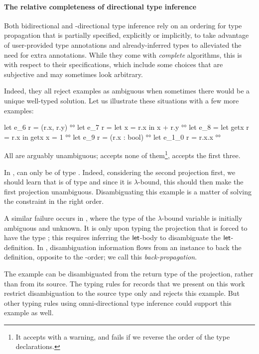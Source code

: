 \documentclass[acmsmall,screen,nonacm,review]{acmart}
\begin{document}
\paragraph{The relative completeness of directional type inference}

Both bidirectional and \geninst-directional type inference rely on an
ordering for type propagation that is partially specified, explicitly or
implicitly, to take advantage of user-provided type annotations and
already-inferred types to alleviated the need for extra annotations.
%
While they come with \emph{complete} algorithms, this is with respect to
their specifications, which include some choices that are subjective and may
sometimes look arbitrary.

\locallabelreset

Indeed, they all reject examples as ambiguous when sometimes there
would be a unique well-typed solution.
%
Let us illustrate these situations with a few more examples:
\begin{program}[input]
let e_6 r = (r.x, r.y)                          °°
let e_7 r = let x = r.x in x + r.y              °°
let e_8 = let getx r = r.x in getx {x = 1}      °°
let e_9 r = (r.x : bool)                        °°
let e_1_0 r = r.x.x                              °°
\end{program}
All are arguably unambiguous; \OCaml accepts none of them\footnote{It
accepts  with a warning, and fails if we reverse the order of the
type declarations.}, \OML accepts the first three.

In ,  can only be of type . Indeed,
considering the second projection first, we should learn that
 is of type  and since it is $\lambda$-bound, this
should then make the first projection unambiguous. Disambiguating this example is a matter
of solving the constraint in the right order.

A similar failure occurs in , where the type of the
$\lambda$-bound variable  is initially ambiguous and
unknown. It is only upon typing the projection  that
 is forced to have the type ; this requires
inferring the $\mathopen{}\mathrel{\mathsf{let}}$-body to disambiguate the $\mathopen{}\mathrel{\mathsf{let}}$-definition.
%
In , disambiguation information flows from an instance to
back the definition, opposite to the \Geninst-order; we call this
\emph{back-propagation}.

The example  can be disambiguated from the return type of the
projection, rather than from its source. The typing rules for records that
we present on this work restrict disambiguation to the source type only and
rejects this example. But
other typing rules using omni-directional type inference could support this
example as well.
\end{document}
